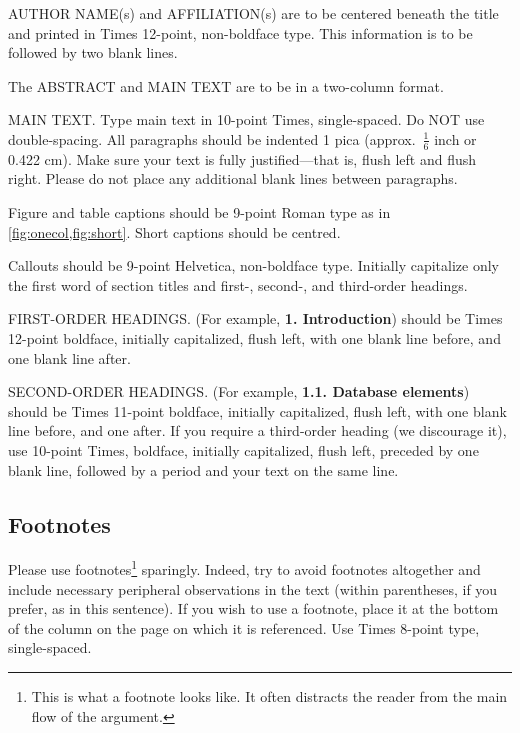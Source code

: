 \documentclass[10pt,twocolumn,letterpaper]{article}
\begin{document}
  AUTHOR NAME(s) and AFFILIATION(s) are to be centered beneath the title
  and printed in Times 12-point, non-boldface type.
  This information is to be followed by two blank lines.

  The ABSTRACT and MAIN TEXT are to be in a two-column format.

  MAIN TEXT.
  Type main text in 10-point Times, single-spaced.
  Do NOT use double-spacing.
  All paragraphs should be indented 1 pica (approx.~$\frac{1}{6}$ inch or 0.422 cm).
  Make sure your text is fully justified---that is, flush left and flush right.
  Please do not place any additional blank lines between paragraphs.

  Figure and table captions should be 9-point Roman type as in \cref{fig:onecol,fig:short}.
  Short captions should be centred.

  \noindent Callouts should be 9-point Helvetica, non-boldface type.
  Initially capitalize only the first word of section titles and first-, second-, and third-order headings.

  FIRST-ORDER HEADINGS.
  (For example, {\large \bf 1. Introduction}) should be Times 12-point boldface, initially capitalized, flush left, with one blank line before, and one blank line after.

  SECOND-ORDER HEADINGS.
  (For example, { \bf 1.1. Database elements}) should be Times 11-point boldface, initially capitalized, flush left, with one blank line before, and one after.
  If you require a third-order heading (we discourage it), use 10-point Times, boldface, initially capitalized, flush left, preceded by one blank line, followed by a period and your text on the same line.

  \subsection{Footnotes}

  Please use footnotes\footnote{This is what a footnote looks like.
  It often distracts the reader from the main flow of the argument.} sparingly.
  Indeed, try to avoid footnotes altogether and include necessary peripheral observations in the text (within parentheses, if you prefer, as in this sentence).
  If you wish to use a footnote, place it at the bottom of the column on the page on which it is referenced.
  Use Times 8-point type, single-spaced.


\end{document}
